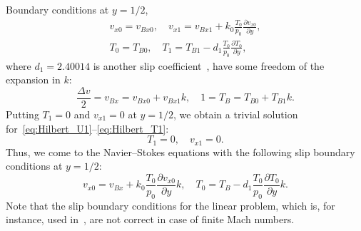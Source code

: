 \documentclass[review]{elsarticle}
\newcommand{\pder}[2][]{\frac{\partial#1}{\partial#2}}
\begin{document}
Boundary conditions at \(y=1/2\),
\begin{gather}
    v_{x0} = v_{Bx0}, \quad v_{x1} = v_{Bx1} + k_0 \frac{T_0}{p_0} \pder[v_{x0}]{y}, \label{eq:hilbert_bc_U}\\
    T_0 = T_{B0}, \quad T_1 = T_{B1} - d_1 \frac{T_0}{p_0} \pder[T_0]{y}, \label{eq:hilbert_bc_T}
\end{gather}
where \(d_1 = 2.40014\) is another slip coefficient~\citep{Takata2015},
have some freedom of the expansion in \(k\):
\begin{equation}\label{eq:hilbert_boundary_expansion}
    \frac{\Delta{v}}2 = v_{Bx} = v_{Bx0} + v_{Bx1}k, \quad 1 = T_B = T_{B0} + T_{B1}k.
\end{equation}
Putting \(T_1 = 0\) and \(v_{x1} = 0\) at \(y=1/2\), we obtain a trivial solution
for~\eqref{eq:Hilbert_U1}--\eqref{eq:Hilbert_T1}:
\begin{equation}\label{eq:hilbert_solution1}
    T_1 = 0, \quad v_{x1} = 0.
\end{equation}
Thus, we come to the Navier--Stokes equations with the following slip boundary conditions at \(y=1/2\):
\begin{equation}\label{eq:hilbert_slip_bc}
    v_{x0} = v_{Bx} + k_0 \frac{T_0}{p_0} \pder[v_{x0}]{y} k, \quad
    T_0 = T_B - d_1 \frac{T_0}{p_0} \pder[T_0]{y} k.
\end{equation}
Note that the slip boundary conditions for the linear problem, which is, for instance,
used in~\citet{Sharipov2000}, are not correct in case of finite Mach numbers.
\end{document}
